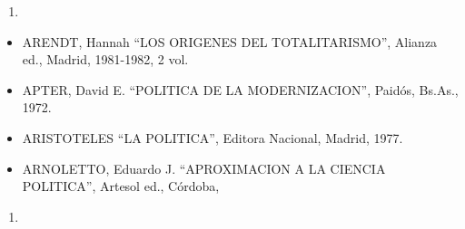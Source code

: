 \documentclass[
]{book}
\providecommand{\tightlist}{%
  \setlength{\itemsep}{0pt}\setlength{\parskip}{0pt}}
\begin{document}
\begin{enumerate}
\def\labelenumi{\arabic{enumi}.}
\setcounter{enumi}{1972}
\tightlist
\item
\end{enumerate}

\begin{itemize}
\tightlist
\item
  ARENDT, Hannah ``LOS ORIGENES DEL TOTALITARISMO'', Alianza ed., Madrid, 1981-1982,
  2 vol.
\item
  APTER, David E. ``POLITICA DE LA MODERNIZACION'', Paidós, Bs.As., 1972.
\item
  ARISTOTELES ``LA POLITICA'', Editora Nacional, Madrid, 1977.
\item
  ARNOLETTO, Eduardo J. ``APROXIMACION A LA CIENCIA POLITICA'', Artesol ed., Córdoba,
\end{itemize}

\begin{enumerate}
\def\labelenumi{\arabic{enumi}.}
\setcounter{enumi}{1988}
\tightlist
\item
\end{enumerate}
\end{document}
